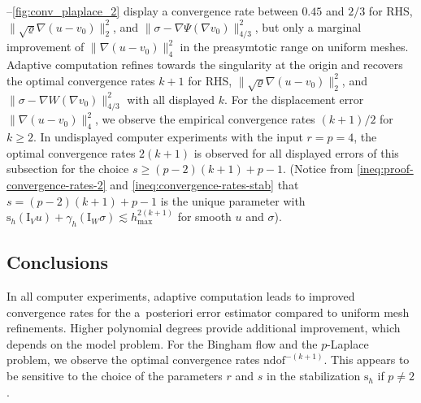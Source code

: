 \documentclass[a4paper]{amsart}
\numberwithin{equation}{section}
\newcommand{\I}{\mathrm{I}}
\newcommand{\s}{\mathrm{s}}
\theoremstyle{remark}
\begin{document}
--\ref{fig:conv_plaplace_2} display a convergence rate between $0.45$ and $2/3$ for RHS, $\|\sqrt{\varrho}\nabla(u - v_0)\|_2^2$, and $\|\sigma - \nabla \Psi(\nabla v_0)\|_{4/3}^2$, but only a marginal improvement of $\|\nabla(u - v_0)\|_4^2$ in the preasymtotic range on uniform meshes.
Adaptive computation refines towards the singularity at the origin and recovers the optimal convergence rates $k+1$ for RHS, $\|\sqrt{\varrho}\nabla(u - v_0)\|_2^2$, and $\|\sigma - \nabla W(\nabla v_0)\|_{4/3}^2$ with all displayed $k$.
For the displacement error $\|\nabla(u - v_0)\|_4^2$, we observe the empirical convergence rates $(k+1)/2$ for $k \geq 2$.
In undisplayed computer experiments with the input $r = p = 4$, the optimal convergence rates $2(k+1)$ is observed for all displayed errors of this subsection for the choice $s \geq (p-2)(k+1) + p - 1$. (Notice from \eqref{ineq:proof-convergence-rates-2} and \eqref{ineq:convergence-rates-stab} that $s = (p-2)(k+1) + p - 1$ is the unique parameter with $\s_h(\I_V u) + \gamma_h(\I_W \sigma) \lesssim h_{\max}^{2(k+1)}$ for smooth $u$ and $\sigma$).

\subsection{Conclusions}
In all computer experiments, adaptive computation leads to improved convergence rates for the a~posteriori error estimator compared to uniform mesh refinements.
Higher polynomial degrees provide additional improvement, which depends on the model problem. For the Bingham flow and the $p$-Laplace problem, we observe the optimal convergence rates $\mathrm{ndof}^{-(k+1)}$. This appears to be sensitive to the choice of the parameters $r$ and $s$ in the stabilization $\s_h$ if $p \neq 2$.



\end{document}
